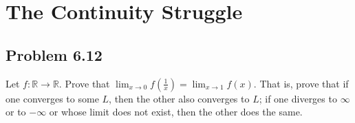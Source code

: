 \documentclass[12pt]{report}
\begin{document}
\renewcommand\qedsymbol{OE$\Delta$}
\newcommand{\abs}[1]{\left| #1 \right|}
\newcommand{\andtxt}{\text{ and }}
\newcommand{\Int}{\text{Int}}
\newcommand{\Ext}{\text{Ext}}
\newcommand{\mathif}{\text{if }}
\newcommand{\seq}[2][n]{\ensuremath{(#2 _{#1})}}

\tableofcontents
\pagebreak

\setcounter{chapter}{5}
\chapter{The Continuity Struggle}
\pagebreak

\setcounter{section}{11}
\section{Problem 6.12}
    Let $f: \mathbb{R} \to \mathbb{R}$. 
    Prove that $\lim_{x \to 0} f\left( \frac{1}{x} \right) = \lim_{x \to 1} f(x)$. 
    That is, prove that if one converges to some $L$, then the  other also converges to $L$; if one diverges to $\infty$ or to $-\infty$ or whose limit does not exist, then the other does the same. 
\end{document}

